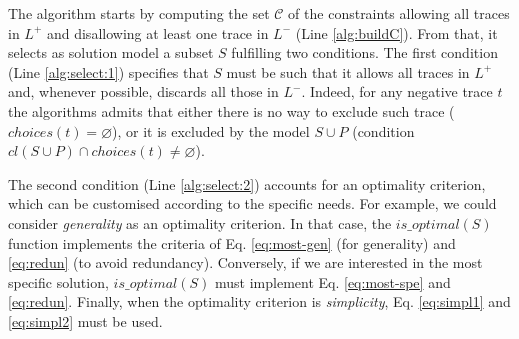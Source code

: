 The algorithm starts by computing the set $\mathcal{C}$ of the constraints allowing all traces in $L^+$ and disallowing at least one trace in $L^-$ (Line \ref{alg:buildC}). From that, it selects as solution model a subset $S$ fulfilling two conditions.
%
The first condition (Line \ref{alg:select:1}) specifies that $S$ must be such that it allows all traces in $L^+$ and, whenever possible, discards all those in $L^-$. Indeed, for any negative trace $t$ the algorithms admits that either there is no way to exclude such trace ($choices(t)=\varnothing$), or it is excluded by the model $S \cup P$ (condition ${cl}(S \cup P)\cap {choices}(t) \neq \varnothing$).
%

%
The second condition (Line \ref{alg:select:2}) accounts for an optimality criterion, which can be customised according to the specific needs. 
%
For example, we could consider \emph{generality} as an optimality criterion. In that case, the $is\_optimal(S)$ function implements the criteria of Eq. \eqref{eq:most-gen} (for generality) and \eqref{eq:redun} (to avoid redundancy).
Conversely, if we are interested in the most specific solution, $is\_optimal(S)$ must implement Eq. \eqref{eq:most-spe} and \eqref{eq:redun}.
Finally, when the optimality criterion is \emph{simplicity}, Eq. \eqref{eq:simpl1} and \eqref{eq:simpl2} must be used.

%
%
%


